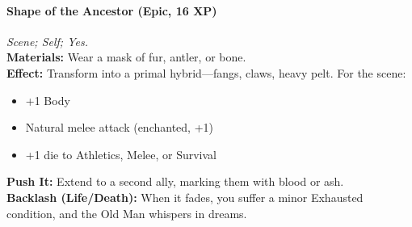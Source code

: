 \paragraph{Shape of the Ancestor (Epic, 16 XP)} \emph{Scene; Self; Yes.}\\
\textbf{Materials:} Wear a mask of fur, antler, or bone.\\
\textbf{Effect:} Transform into a primal hybrid—fangs, claws, heavy pelt. For the scene:
\begin{itemize}
  \item +1 Body
  \item Natural melee attack (enchanted, +1)
  \item +1 die to Athletics, Melee, or Survival
\end{itemize}
\textbf{Push It:} Extend to a second ally, marking them with blood or ash.\\
\textbf{Backlash (Life/Death):} When it fades, you suffer a minor Exhausted condition, and the Old Man whispers in dreams.
